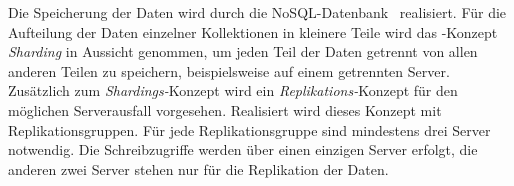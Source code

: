 Die Speicherung der Daten wird durch die NoSQL-Datenbank \mongo\ realisiert. Für die Aufteilung der Daten einzelner Kollektionen in kleinere Teile wird das \mongo-Konzept \textit{Sharding} in Aussicht genommen, um jeden Teil der Daten getrennt von allen anderen Teilen zu speichern, beispielsweise auf einem getrennten Server. Zusätzlich zum \textit{Shardings-}Konzept wird ein \textit{Replikations-}Konzept für den möglichen Serverausfall vorgesehen. Realisiert wird dieses Konzept mit  Replikationsgruppen. Für jede Replikationsgruppe sind mindestens drei Server notwendig. Die Schreibzugriffe werden über einen einzigen Server erfolgt, die anderen zwei Server stehen nur für die Replikation der Daten.
